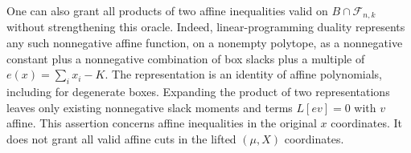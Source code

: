 One can also grant all products of two affine inequalities valid on
$B\cap\mathcal F_{n,k}$ without strengthening this oracle. Indeed,
linear-programming duality represents any such nonnegative affine
function, on a nonempty polytope, as a nonnegative constant plus a
nonnegative combination of box slacks plus a multiple of
$e(x)=\sum_i x_i-K$. The representation is an identity of affine
polynomials, including for degenerate boxes. Expanding the product of
two representations leaves only existing nonnegative slack moments and
terms $L[e v]=0$ with $v$ affine. This assertion concerns affine
inequalities in the original $x$ coordinates. It does not grant all
valid affine cuts in the lifted $(\mu,X)$ coordinates.

